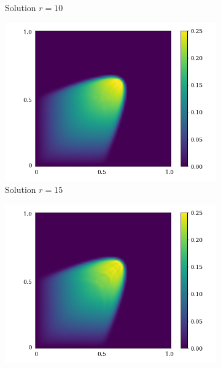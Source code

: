 \begin{figure}[!htb]
\begin{center}
\begin{subfigure}[b]{0.23\textwidth}
\begin{center}
        \end{center}
            \caption{Solution $r = 10$}
        \end{subfigure}
   \begin{subfigure}[b]{0.23\textwidth}
            \begin{center}
                \includegraphics[trim = {0, 0, 3cm, 0}, clip, width=\textwidth]{Pictures/X-rom-NE-DAE-15.png}
            \end{center}
            \caption{Solution $r = 15$}
        \end{subfigure}
   \begin{subfigure}[b]{0.23\textwidth}
            \begin{center}
                \includegraphics[trim = {0, 0, 3cm, 0}, clip, width=\textwidth]{Pictures/X-rom-NE-DAE-20.png}

\end{center}
\end{subfigure}
\end{center}
\end{figure}
